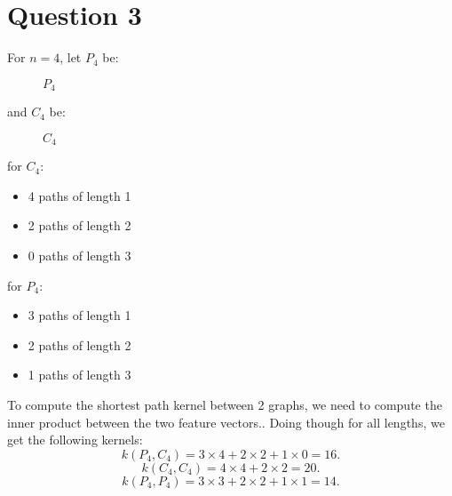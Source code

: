 \documentclass[a4paper]{article}
\begin{document}
\section*{Question 3}
For $n=4$, let $P_4$ be:
\begin{figure}[ht]
    \centering
    \caption{$P_4$}
\end{figure}

and $C_4$ be:
\begin{figure}[ht]
    \centering
    \caption{$C_4$}
\end{figure}

for $C_4$:
\begin{itemize}
    \item 4 paths of length 1
    \item 2 paths of length 2
    \item 0 paths of length 3
\end{itemize}

for $P_4$:
\begin{itemize}
    \item 3 paths of length 1
    \item 2 paths of length 2
    \item 1 paths of length 3
\end{itemize}

To compute the shortest path kernel between 2 graphs, we need to compute the inner product between the two feature vectors..
Doing though for all lengths, we get the following kernels:
$$
    k(P_4, C_4) = 3 \times 4 + 2 \times 2 + 1 \times 0 = 16.
$$
$$
    k(C_4, C_4) = 4 \times 4 + 2 \times 2 = 20.
$$
$$
    k(P_4, P_4) = 3 \times 3 + 2 \times 2 + 1 \times 1 = 14.
$$
\end{document}
